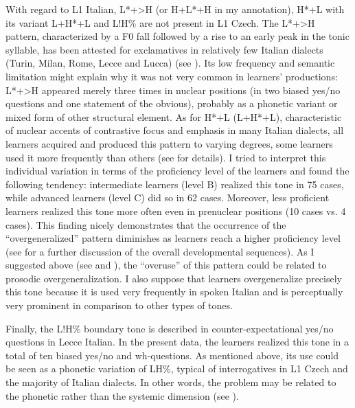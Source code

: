 With regard to L1 Italian, L*+>H (or H+L*+H in my annotation), H*+L with its variant L+H*+L and L!H\% are not present in L1 Czech. The L*+>H pattern, characterized by a F0 fall followed by a rise to an early peak in the tonic syllable, has been attested for exclamatives in relatively few Italian dialects (Turin, Milan, Rome, Lecce and Lucca) (see \citealt{GiliFivelaEtAl2015}). Its low frequency and semantic limitation might explain why it was not very common in learners’ productions: L*+>H appeared merely three times in nuclear positions (in two biased yes/no questions and one statement of the obvious), probably as a phonetic variant or mixed form of other structural element. As for H*+L (L+H*+L), characteristic of nuclear accents of contrastive focus and emphasis in many Italian dialects, all learners acquired and produced this pattern to varying degrees, some learners used it more frequently than others (see \citealt{Pešková2022b} for details). I tried to interpret this individual variation in terms of the proficiency level of the learners and found the following tendency: intermediate learners (level B) realized this tone in 75 cases, while advanced learners (level C) did so in 62 cases. Moreover, less proficient learners realized this tone more often even in prenuclear positions (10 cases vs. 4 cases). This finding nicely demonstrates that the occurrence of the “overgeneralized” pattern diminishes as learners reach a higher proficiency level (see  for a further discussion of the overall developmental sequences). As I suggested above (see  and ), the “overuse” of this pattern could be related to prosodic overgeneralization. I also suppose that learners overgeneralize precisely this tone because it is used very frequently in spoken Italian and is perceptually very prominent in comparison to other types of tones.



Finally, the L!H\% boundary tone is described in counter-expectational yes/no questions in Lecce Italian. In the present data, the learners realized this tone in a total of ten biased yes/no and wh-questions. As mentioned above, its use could be seen as a phonetic variation of LH\%, typical of interrogatives in L1 Czech and the majority of Italian dialects. In other words, the problem may be related to the phonetic rather than the systemic dimension (see ).



